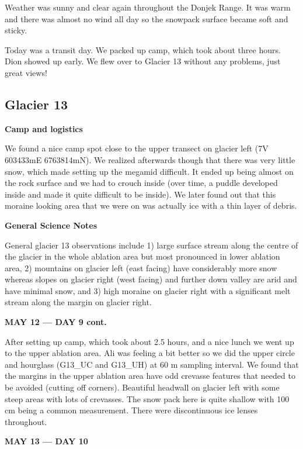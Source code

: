 \documentclass[12pt]{article}
\begin{document}
Weather was sunny and clear again throughout the Donjek Range. It was warm and there was almost no wind all day so the snowpack surface became soft and sticky.

Today was a transit day. We packed up camp, which took about three hours. Dion showed up early. We flew over to Glacier 13 without any problems, just great views! 

\subsection{Glacier 13}

\textbf{Camp and logistics}

We found a nice camp spot close to the upper transect on glacier left (7V 603433mE 6763814mN). We realized afterwards though that there was very little snow, which made setting up the megamid difficult. It ended up being almost on the rock surface and we had to crouch inside (over time, a puddle developed inside and made it quite difficult to be inside). We later found out that this moraine looking area that we were on was actually ice with a thin layer of debris. 

\vspace{4mm}
\noindent \textbf{General Science Notes}

General glacier 13 observations include 1) large surface stream along the centre of the glacier in the whole ablation area but most pronounced in lower ablation area, 2) mountains on glacier left (east facing) have considerably more snow whereas slopes on glacier right (west facing) and further down valley are arid and have minimal snow, and 3) high moraine on glacier right with a significant melt stream along the margin on glacier right. 

\vspace{4mm}
\noindent \textbf{MAY 12 --- DAY 9 cont.}

After setting up camp, which took about 2.5 hours, and a nice lunch we went up to the upper ablation area. Ali was feeling a bit better so we did the upper circle and hourglass (G13\_UC and G13\_UH) at 60 m sampling interval. We found that the margins in the upper ablation area have odd crevasse features that needed to be avoided (cutting off corners). Beautiful headwall on glacier left with some steep areas with lots of crevasses. The snow pack here is quite shallow with 100 cm being a common measurement. There were discontinuous ice lenses throughout. 

\vspace{4mm}
\noindent \textbf{MAY 13 --- DAY 10}
\end{document}
